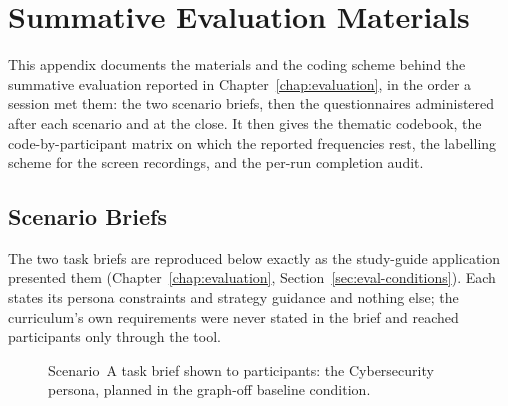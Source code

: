 \chapter{Summative Evaluation Materials}
\label{app:eval-materials}

This appendix documents the materials and the coding scheme behind the summative evaluation reported in Chapter~\ref{chap:evaluation}, in the order a session met them: the two scenario briefs, then the questionnaires administered after each scenario and at the close. It then gives the thematic codebook, the code-by-participant matrix on which the reported frequencies rest, the labelling scheme for the screen recordings, and the per-run completion audit.

\section{Scenario Briefs}
\label{app:eval-scenarios}

The two task briefs are reproduced below exactly as the study-guide application presented them (Chapter~\ref{chap:evaluation}, Section~\ref{sec:eval-conditions}). Each states its persona constraints and strategy guidance and nothing else; the curriculum's own requirements were never stated in the brief and reached participants only through the tool.

\begin{figure}[htpb]
    \centering
    \caption{Scenario~A task brief shown to participants: the Cybersecurity persona, planned in the graph-off baseline condition.}
    \label{fig:scenario-a}
\end{figure}

